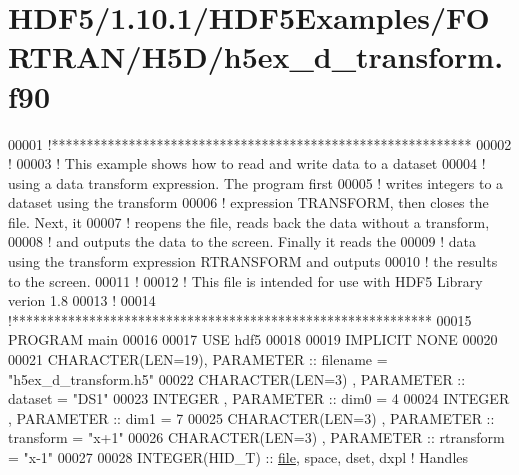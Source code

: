 \hypertarget{_h_d_f5_21_810_81_2_h_d_f5_examples_2_f_o_r_t_r_a_n_2_h5_d_2h5ex__d__transform_8f90_source}{}\section{H\+D\+F5/1.10.1/\+H\+D\+F5\+Examples/\+F\+O\+R\+T\+R\+A\+N/\+H5\+D/h5ex\+\_\+d\+\_\+transform.f90}
\label{_h_d_f5_21_810_81_2_h_d_f5_examples_2_f_o_r_t_r_a_n_2_h5_d_2h5ex__d__transform_8f90_source}

\begin{DoxyCode}
00001 \textcolor{comment}{!************************************************************}
00002 \textcolor{comment}{!}
00003 \textcolor{comment}{!  This example shows how to read and write data to a dataset}
00004 \textcolor{comment}{!  using a data transform expression.  The program first}
00005 \textcolor{comment}{!  writes integers to a dataset using the transform}
00006 \textcolor{comment}{!  expression TRANSFORM, then closes the file.  Next, it}
00007 \textcolor{comment}{!  reopens the file, reads back the data without a transform,}
00008 \textcolor{comment}{!  and outputs the data to the screen.  Finally it reads the}
00009 \textcolor{comment}{!  data using the transform expression RTRANSFORM and outputs}
00010 \textcolor{comment}{!  the results to the screen.}
00011 \textcolor{comment}{!}
00012 \textcolor{comment}{!  This file is intended for use with HDF5 Library verion 1.8}
00013 \textcolor{comment}{!}
00014 \textcolor{comment}{!************************************************************}
00015 \textcolor{keyword}{PROGRAM} main
00016 
00017   \textcolor{keywordtype}{USE }hdf5
00018 
00019   \textcolor{keywordtype}{IMPLICIT NONE}
00020 
00021   \textcolor{keywordtype}{CHARACTER(LEN=19)}, \textcolor{keywordtype}{PARAMETER} :: filename = \textcolor{stringliteral}{"h5ex\_d\_transform.h5"}
00022   \textcolor{keywordtype}{CHARACTER(LEN=3)} , \textcolor{keywordtype}{PARAMETER} :: dataset  = \textcolor{stringliteral}{"DS1"}
00023   \textcolor{keywordtype}{INTEGER}          , \textcolor{keywordtype}{PARAMETER} :: dim0     = 4
00024   \textcolor{keywordtype}{INTEGER}          , \textcolor{keywordtype}{PARAMETER} :: dim1     = 7
00025   \textcolor{keywordtype}{CHARACTER(LEN=3)} , \textcolor{keywordtype}{PARAMETER} :: transform = \textcolor{stringliteral}{"x+1"}
00026   \textcolor{keywordtype}{CHARACTER(LEN=3)} , \textcolor{keywordtype}{PARAMETER} :: rtransform = \textcolor{stringliteral}{"x-1"}
00027 
00028   \textcolor{keywordtype}{INTEGER(HID\_T)}  :: \hyperlink{structfile}{file}, space, dset, dxpl \textcolor{comment}{! Handles}

\end{DoxyCode}
